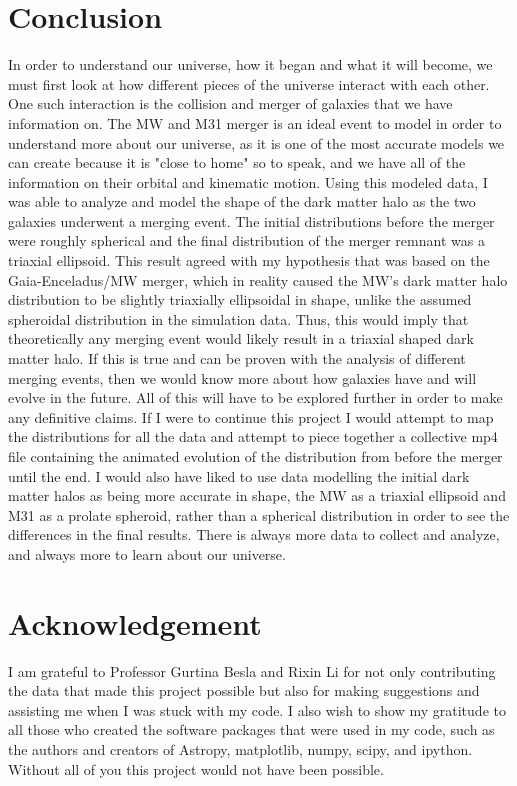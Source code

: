 \documentclass{aastex63}
\begin{document}
\section{Conclusion}
In order to understand our universe, how it began and what it will become, we must first look at how different pieces of the universe interact with each other. One such interaction is the collision and merger of galaxies that we have information on. The MW and M31 merger is an ideal event to model in order to understand more about our universe, as it is one of the most accurate models we can create because it is "close to home" so to speak, and we have all of the information on their orbital and kinematic motion. Using this modeled data, I was able to analyze and model the shape of the dark matter halo as the two galaxies underwent a merging event. The initial distributions before the merger were roughly spherical and the final distribution of the merger remnant was a triaxial ellipsoid. This result agreed with my hypothesis that was based on the Gaia-Enceladus/MW merger, which in reality caused the MW's dark matter halo distribution to be slightly triaxially ellipsoidal in shape, unlike the assumed spheroidal distribution in the simulation data. Thus, this would imply that theoretically any merging event would likely result in a triaxial shaped dark matter halo. If this is true and can be proven with the analysis of different merging events, then we would know more about how galaxies have and will evolve in the future. All of this will have to be explored further in order to make any definitive claims. If I were to continue this project I would attempt to map the distributions for all the data and attempt to piece together a collective mp4 file containing the animated evolution of the distribution from before the merger until the end. I would also have liked to use data modelling the initial dark matter halos as being more accurate in shape, the MW as a triaxial ellipsoid and M31 as a prolate spheroid, rather than a spherical distribution in order to see the differences in the final results. There is always more data to collect and analyze, and always more to learn about our universe.

\section*{Acknowledgement}
I am grateful to Professor Gurtina Besla and Rixin Li for not only contributing the data that made this project possible but also for making suggestions and assisting me when I was stuck with my code. I also wish to show my gratitude to all those who created the software packages that were used in my code, such as the authors and creators of Astropy\cite{Astropy Collaboration_2018}, matplotlib\cite{Hunter_2007}, numpy\cite{Van Der Walt_2011}, scipy\cite{SciPy_2020}, and ipython\cite{Perez_2007}. Without all of you this project would not have been possible.
\end{document}
